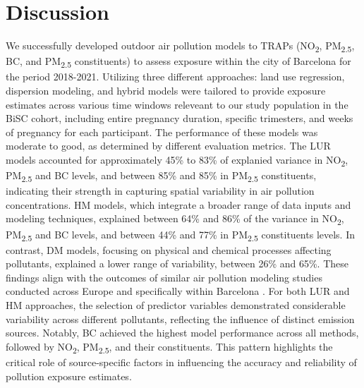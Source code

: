 \documentclass{article}
\begin{document}
\newpage

\section{Discussion}

We successfully developed outdoor air pollution models to TRAPs (NO\textsubscript{2}, PM\textsubscript{2.5}, BC, and PM\textsubscript{2.5} constituents) to assess exposure within the city of Barcelona for the period 2018-2021. Utilizing three different approaches: land use regression, dispersion modeling, and hybrid models were tailored to provide exposure estimates across various time windows releveant to our study population in the BiSC cohort, including entire pregnancy duration, specific trimesters, and weeks of pregnancy for each participant. The performance of these models was moderate to good, as determined by different evaluation metrics. The LUR models accounted for approximately 45\% to 83\% of explanied variance in NO\textsubscript{2}, PM\textsubscript{2.5} and BC levels, and between 85\% and 85\% in PM\textsubscript{2.5} constituents, indicating their strength in capturing spatial variability in air pollution concentrations. HM models, which integrate a broader range of data inputs and modeling techniques, explained between 64\% and 86\% of the variance in NO\textsubscript{2}, PM\textsubscript{2.5} and BC levels, and between 44\% and 77\% in PM\textsubscript{2.5} constituents levels. In contrast, DM models, focusing on physical and chemical processes affecting pollutants, explained a lower range of variability, between 26\% and 65\%. These findings align with the outcomes of similar air pollution modeling studies conducted across Europe and specifically within Barcelona \cite{fung2024, mila2023, criado2023, rovira2022, chen2020, dehoogh2018, dehoogh2013}. For both LUR and HM approaches, the selection of predictor variables demonstrated considerable variability across different pollutants, reflecting the influence of distinct emission sources. Notably, BC achieved the highest model performance across all methods, followed by NO\textsubscript{2}, PM\textsubscript{2.5}, and their constituents. This pattern highlights the critical role of source-specific factors in influencing the accuracy and reliability of pollution exposure estimates.\\
\end{document}
